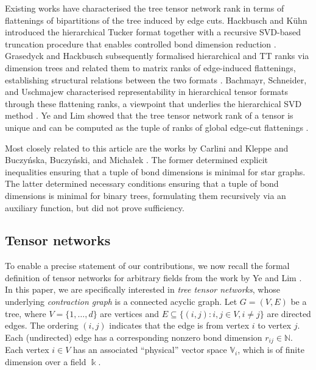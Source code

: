 \documentclass{amsart}
\theoremstyle{plain}
\theoremstyle{definition}
\theoremstyle{remark}
\begin{document}
Existing works have characterised the tree tensor network rank in terms of flattenings of bipartitions of the tree induced by edge cuts. Hackbusch and Kühn introduced the hierarchical Tucker format together with a recursive SVD-based truncation procedure that enables controlled bond dimension reduction \cite{hackbuschNewSchemeTensor2009a}. Grasedyck and Hackbusch subsequently formalised hierarchical and TT ranks via dimension trees and related them to matrix ranks of edge-induced flattenings, establishing structural relations between the two formats \cite{grasedyckIntroductionHierarchicalRank2011}. Bachmayr, Schneider, and Uschmajew characterised representability in hierarchical tensor formats through these flattening ranks, a viewpoint that underlies the hierarchical SVD method \cite[Theorem 3.3]{bachmayrTensorNetworksHierarchical2016a}. Ye and Lim showed that the tree tensor network rank of a tensor is unique and can be computed as the tuple of ranks of global edge-cut flattenings \cite[Theorems 8.3 and 8.8]{limandye}.

Most closely related to this article are the works by Carlini and Kleppe \cite{carlinikleppe} and Buczy\'nska, Buczy\'nski, and Micha{\l}ek \cite{buczynskaHackbuschConjectureTensor2015}. The former determined explicit inequalities ensuring that a tuple of bond dimensions is minimal for star graphs. The latter determined necessary conditions ensuring that a tuple of bond dimensions is minimal for binary trees, formulating them recursively via an auxiliary function, but did not prove sufficiency.

\subsection{Tensor networks}\label{sec:prelim}
To enable a precise statement of our contributions, we now recall the formal definition of tensor networks for arbitrary fields from the work by Ye and Lim \cite{limandye}. In this paper, we are specifically interested in \textit{tree tensor networks}, whose underlying \textit{contraction graph} is a connected acyclic graph. Let $G = (V, E)$ be a tree, where $V=\{1,\dots, d\}$ are vertices and $E \subseteq \{(i, j) : i, j \in V, i \ne j\}$ are directed edges. The ordering $(i,j)$ indicates that the edge is from vertex $i$ to vertex $j$. Each (undirected) edge has a corresponding nonzero bond dimension $r_{ij} \in \mathbb N$. Each vertex $i\in V$ has an associated ``physical'' vector space $\mathbb V_i$, which is of finite dimension over a field $\Bbbk$. 
\end{document}
